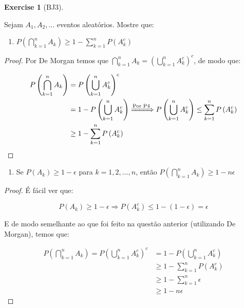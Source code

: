 \documentclass[
]{article}
\providecommand{\tightlist}{%
  \setlength{\itemsep}{0pt}\setlength{\parskip}{0pt}}
\theoremstyle{definition}
\theoremstyle{definition}
\theoremstyle{definition}
\newtheorem{exercise}{Exercise}[section]
\theoremstyle{definition}
\theoremstyle{remark}
\begin{document}
\begin{exercise}[BJ3]
\protect\hypertarget{exr:exbj3}{}\label{exr:exbj3}

Sejam \(A_{1}, A_{2},\dots\) eventos aleatórios. Mostre que:

\begin{enumerate}
\def\labelenumi{\alph{enumi})}
\tightlist
\item
  \(P\left(\bigcap_{k=1}^{n}A_{k}\right) \ge 1 - \sum_{k=1}^{n}P(A_{k}^{c})\)
\end{enumerate}

\begin{proof}
Por De Morgan temos que \(\bigcap_{k=1}^{n}A_{k} = \left(\bigcup_{k=1}^{n}A_{k}^{c}\right)^{c}\), de modo que:

\begin{align*}
P\left(\bigcap_{k=1}^{n}A_{k}\right) &= P\left(\bigcup_{k=1}^{n}A_{k}^{c}\right)^{c} \\
&= 1 - P\left(\bigcup_{k=1}^{n}A_{k}^{c}\right) \xRightarrow[]{\text{Por P4}} P\left(\bigcup_{k=1}^{n}A_{k}^{c}\right) \le \sum_{k=1}^{n}P\left(A_{k}^{c}\right) \\
&\ge 1 - \sum_{k=1}^{n}P\left(A_{k}^{c}\right)
\end{align*}
\end{proof}

\begin{enumerate}
\def\labelenumi{\alph{enumi})}
\setcounter{enumi}{1}
\tightlist
\item
  Se \(P(A_{k}) \ge 1 - \epsilon\) para \(k = 1,2,\dots,n\), então \(P(\bigcap_{k=1}^{n}A_{k}) \ge 1 - n\epsilon\)
\end{enumerate}

\begin{proof}
É fácil ver que:

\[
P(A_{k}) \ge 1 - \epsilon \Rightarrow P(A_{k}^{c}) \le 1 - (1-\epsilon) = \epsilon
\]

E de modo semelhante ao que foi feito na questão anterior (utilizando De Morgan), temos que:

\begin{align*}
P\left(\bigcap_{k=1}^{n}A_{k}\right) = P\left(\bigcup_{k=1}^{n}A_{k}^{c}\right)^{c} &= 1 - P\left(\bigcup_{k=1}^{n}A_{k}^{c}\right)\\
&\ge 1 - \sum_{k=1}^{n}P\left(A_{k}^{c}\right) \\
&\ge 1 - \sum_{k=1}^{n}\epsilon\\
&\ge 1 - n\epsilon
\end{align*}
\end{proof}


\end{exercise}
\end{document}
